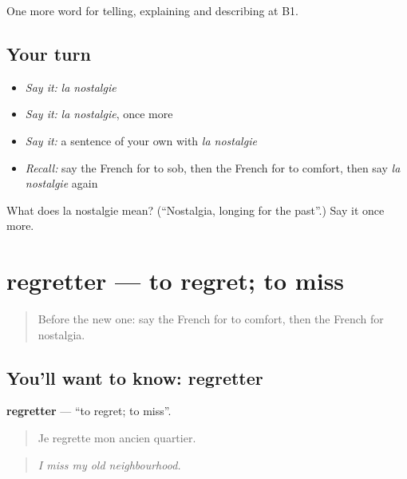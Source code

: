 \begin{grammarlens}[title={What you've built}]
One more word for telling, explaining and describing at B1.
\end{grammarlens}

\subsection*{Your turn}
\begin{itemize}
\raggedright
  \item \emph{Say it:} \emph{la nostalgie}
  \item \emph{Say it:} \emph{la nostalgie}, once more
  \item \emph{Say it:} a sentence of your own with \emph{la nostalgie}
  \item \emph{Recall:} say the French for to sob, then the French for to comfort, then say \emph{la nostalgie} again
\end{itemize}

\begin{tcolorbox}[breakable,colback=teal!4,colframe=teal!35!black,title={Before you move on}]
What does la nostalgie mean? (\textquotedblleft{}Nostalgia, longing for the past\textquotedblright{}.) Say it once more.
\end{tcolorbox}
\section[regretter]{regretter — to regret; to miss}

\label{lesson:FR-C472-regretter}



\begin{quote}
Before the new one: say the French for to comfort, then the French for nostalgia.
\end{quote}

\subsection*{You'll want to know: regretter}
\textbf{regretter} — \textquotedblleft{}to regret; to miss\textquotedblright{}.

\begin{quote}
Je regrette mon ancien quartier.
\end{quote}

\begin{quote}
\emph{I miss my old neighbourhood.}
\end{quote}

